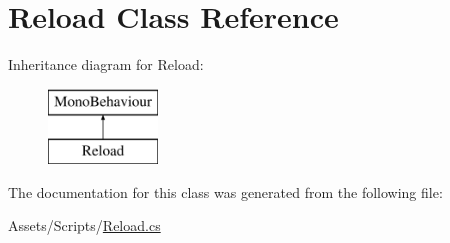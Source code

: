 \hypertarget{class_reload}{}\section{Reload Class Reference}
\label{class_reload}
Inheritance diagram for Reload\+:\begin{figure}[H]
\begin{center}
\leavevmode
\includegraphics[height=2.000000cm]{class_reload}
\end{center}
\end{figure}


The documentation for this class was generated from the following file\+:\begin{DoxyCompactItemize}
\item 
Assets/\+Scripts/\hyperlink{_reload_8cs}{Reload.\+cs}\end{DoxyCompactItemize}
